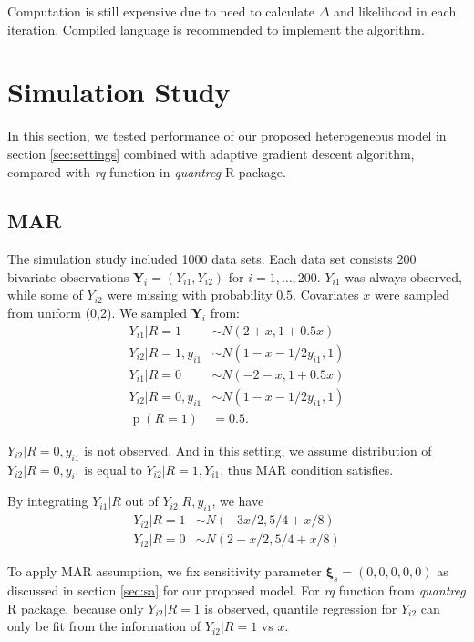 \documentclass[12pt]{article}
\DeclareMathOperator{\pr}{p}
\begin{document}
Computation is still expensive due to need to calculate $\Delta$ and
likelihood in each iteration. Compiled language is recommended to
implement the algorithm.

\section{Simulation Study}
\label{sec:simulation}
In this section, we tested performance of our proposed heterogeneous
model in section \ref{sec:settings} combined with adaptive gradient
descent algorithm, compared with \textit{rq} function in
\textit{quantreg} R package.

\subsection{MAR}

The simulation study included 1000 data sets. Each data set consists
200 bivariate observations $\bm Y_i = (Y_{i1}, Y_{i2})$ for $i = 1,
\ldots, 200$. $Y_{i1}$ was always observed, while some of $Y_{i2}$
were missing with probability $0.5$. Covariates $x$ were sampled from
uniform (0,2). We sampled $\bm Y_i$ from:
\begin{align*}
  Y_{i1} |R = 1 & \sim N ( 2 + x, 1 + 0.5x)\\
  Y_{i2} | R = 1, y_{i1} & \sim N(1 - x - 1/2y_{i1}, 1) \\
  Y_{i1}| R= 0 & \sim N(-2 - x, 1 + 0.5x) \\
  Y_{i2}| R= 0, y_{i1} & \sim N(1 - x - 1/2y_{i1}, 1) \\
  \pr (R = 1) & = 0.5.
\end{align*}

$Y_{i2}| R = 0, y_{i1}$ is not observed. And in this setting, we
assume distribution of $Y_{i2} | R = 0, y_{i1}$ is equal to $Y_{i2}|
R= 1, Y_{i1}$, thus MAR condition satisfies.

By integrating $Y_{i1}|R$ out of $Y_{i2}|R, y_{i1}$, we have
\begin{align*}
  Y_{i2} | R = 1 & \sim N( - 3x/2, 5/4 + x/8) \\
  Y_{i2} | R = 0 & \sim N( 2 - x/2, 5/4 + x/8)
\end{align*}

To apply MAR assumption, we fix sensitivity parameter $\bm \xi_s =
(0,0,0,0,0)$ as discussed in section \ref{sec:sa} for our proposed
model. For \textit{rq} function from \textit{quantreg} R package,
because only $Y_{i2}| R = 1$ is observed, quantile regression for
$Y_{i2}$ can only be fit from the information of $Y_{i2}|R = 1$ vs
$x$.
\end{document}
